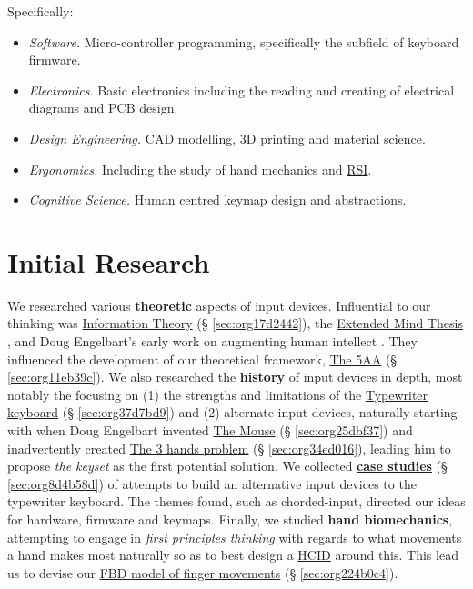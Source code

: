 \documentclass[logo,bsc,singlespacing,parskip]{infthesis}
\begin{document}
Specifically:
\begin{itemize}
\item \emph{Software.} Micro-controller programming, specifically the subfield of keyboard firmware.
\item \emph{Electronics.} Basic electronics including the reading and creating of electrical diagrams and PCB design.
\item \emph{Design Engineering.} CAD modelling, 3D printing and material science.
\item \emph{Ergonomics.} Including the study of hand mechanics and \hyperref[orgafdb7af]{RSI}.
\item \emph{Cognitive Science.} Human centred keymap design and abstractions.
\end{itemize}
\chapter{Initial Research}
\label{sec:orgea1d211}
We researched various \textbf{theoretic} aspects of input devices.
Influential to our thinking was \hyperref[sec:org17d2442]{Information Theory} (§ \ref{sec:org17d2442}), the \hyperref[extended mind thesis]{Extended Mind Thesis} \autocite{ExtendedMindAndy}, and Doug Engelbart's early work on augmenting human intellect \autocite{engelbartAugmentingHumanIntellect1962}.
They influenced the development of our theoretical framework, \hyperref[sec:org11eb39c]{The 5AA} (§ \ref{sec:org11eb39c}).
We also researched the \textbf{history} of input devices in depth, most notably the focusing on (1) the strengths and limitations of the \hyperref[sec:org37d7bd9]{Typewriter keyboard} (§ \ref{sec:org37d7bd9}) and (2) alternate input devices, naturally starting with when Doug Engelbart invented \hyperref[sec:org25dbf37]{The Mouse} (§ \ref{sec:org25dbf37}) and inadvertently created \hyperref[sec:org34ed016]{The 3 hands problem} (§ \ref{sec:org34ed016}), leading him to propose \emph{the keyset} as the first potential solution.
We collected \hyperref[sec:org8d4b58d]{\textbf{case studies}} (§ \ref{sec:org8d4b58d}) of attempts to build an alternative input devices to the typewriter keyboard.
The themes found, such as chorded-input, directed our ideas for hardware, firmware and keymaps.
Finally, we studied \textbf{hand biomechanics}, attempting to engage in \emph{first principles thinking} with regards to what movements a hand makes most naturally so as to best design a \hyperref[org917851e]{HCID} around this.
This lead us to devise our \hyperref[sec:org224b0c4]{FBD model of finger movements} (§ \ref{sec:org224b0c4}).
\end{document}
